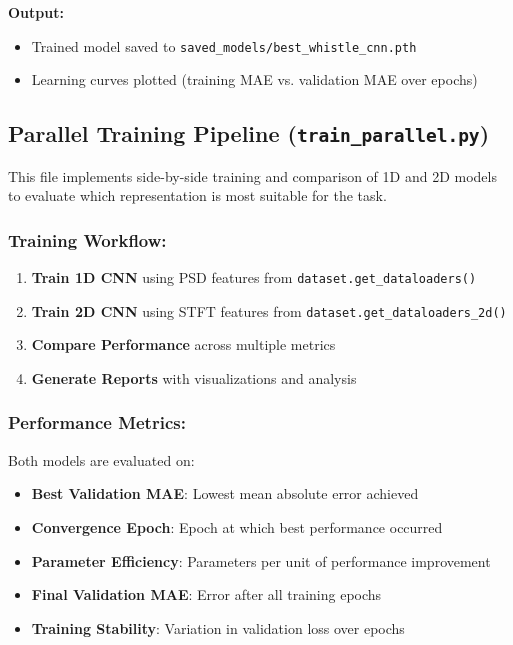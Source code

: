 \textbf{Output:}
\begin{itemize}
    \item Trained model saved to \verb|saved_models/best_whistle_cnn.pth|
    \item Learning curves plotted (training MAE vs. validation MAE over epochs)
\end{itemize}

\subsection{Parallel Training Pipeline (\texttt{train\_parallel.py})}

This file implements side-by-side training and comparison of 1D and 2D models to evaluate 
which representation is most suitable for the task.

\subsubsection{Training Workflow:}
\begin{enumerate}
    \item \textbf{Train 1D CNN} using PSD features from \verb|dataset.get_dataloaders()|
    \item \textbf{Train 2D CNN} using STFT features from \verb|dataset.get_dataloaders_2d()|
    \item \textbf{Compare Performance} across multiple metrics
    \item \textbf{Generate Reports} with visualizations and analysis
\end{enumerate}

\subsubsection{Performance Metrics:}
Both models are evaluated on:
\begin{itemize}
    \item \textbf{Best Validation MAE}: Lowest mean absolute error achieved
    \item \textbf{Convergence Epoch}: Epoch at which best performance occurred
    \item \textbf{Parameter Efficiency}: Parameters per unit of performance improvement
    \item \textbf{Final Validation MAE}: Error after all training epochs
    \item \textbf{Training Stability}: Variation in validation loss over epochs
\end{itemize}

